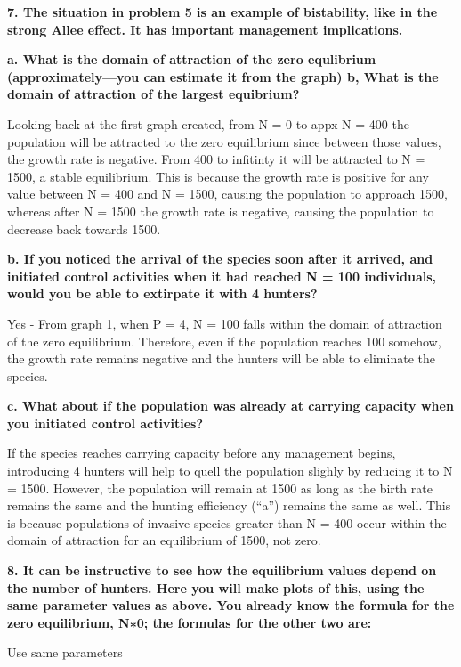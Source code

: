 \documentclass[]{article}
\begin{document}
\textbf{7. The situation in problem 5 is an example of bistability, like
in the strong Allee effect. It has important management implications.}

\textbf{a. What is the domain of attraction of the zero equlibrium
(approximately---you can estimate it from the graph) b, What is the
domain of attraction of the largest equibrium?}

Looking back at the first graph created, from N = 0 to appx N = 400 the
population will be attracted to the zero equilibrium since between those
values, the growth rate is negative. From 400 to infitinty it will be
attracted to N = 1500, a stable equilibrium. This is because the growth
rate is positive for any value between N = 400 and N = 1500, causing the
population to approach 1500, whereas after N = 1500 the growth rate is
negative, causing the population to decrease back towards 1500.

\textbf{b. If you noticed the arrival of the species soon after it
arrived, and initiated control activities when it had reached N = 100
individuals, would you be able to extirpate it with 4 hunters?}

Yes - From graph 1, when P = 4, N = 100 falls within the domain of
attraction of the zero equilibrium. Therefore, even if the population
reaches 100 somehow, the growth rate remains negative and the hunters
will be able to eliminate the species.

\textbf{c. What about if the population was already at carrying capacity
when you initiated control activities?}

If the species reaches carrying capacity before any management begins,
introducing 4 hunters will help to quell the population slighly by
reducing it to N = 1500. However, the population will remain at 1500 as
long as the birth rate remains the same and the hunting efficiency
(``a'') remains the same as well. This is because populations of
invasive species greater than N = 400 occur within the domain of
attraction for an equilibrium of 1500, not zero.

\textbf{8. It can be instructive to see how the equilibrium values
depend on the number of hunters. Here you will make plots of this, using
the same parameter values as above. You already know the formula for the
zero equilibrium, N∗0; the formulas for the other two are:}

Use same parameters
\end{document}
